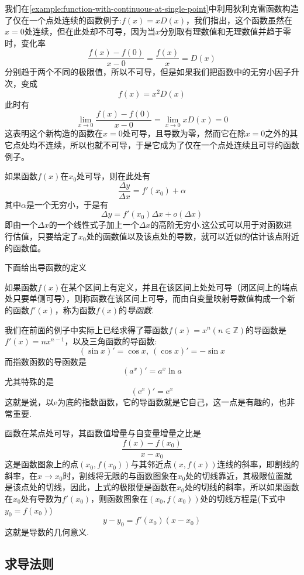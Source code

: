 \begin{example}
  我们在\autoref{example:function-with-continuous-at-single-point}中利用狄利克雷函数构造了仅在一个点处连续的函数例子:$f(x)=xD(x)$，我们指出，这个函数虽然在$x=0$处连续，但在此处却不可导，因为当$x$分别取有理数值和无理数值并趋于零时，变化率
  \[ \frac{f(x)-f(0)}{x-0} = \frac{f(x)}{x} = D(x) \]
  分别趋于两个不同的极限值，所以不可导，但是如果我们把函数中的无穷小因子升次，变成
  \[ f(x)=x^2D(x) \]
  此时有
  \[ \lim_{x \to 0} \frac{f(x)-f(0)}{x-0} = \lim_{x \to 0} xD(x) = 0 \]
  这表明这个新构造的函数在$x=0$处可导，且导数为零，然而它在除$x=0$之外的其它点处均不连续，所以也就不可导，于是它成为了仅在一个点处连续且可导的函数例子。
\end{example}

如果函数$f(x)$在$x_0$处可导，则在此处有
\[ \frac{\Delta y}{\Delta x} = f'(x_0)+\alpha \]
其中$\alpha$是一个无穷小，于是有
\[ \Delta y = f'(x_0)\Delta x + o(\Delta x) \]
即由一个$\Delta x$的一个线性式子加上一个$\Delta x$的高阶无穷小.这公式可以用于对函数进行估值，只要给定了$x_0$处的函数值以及该点处的导数，就可以近似的估计该点附近的函数值。

下面给出导函数的定义
\begin{definition}
  如果函数$f(x)$在某个区间上有定义，并且在该区间上处处可导（闭区间上的端点处只要单侧可导），则称函数在该区间上可导，而由自变量映射导数值构成一个新的函数$f'(x)$，称为函数$f(x)$的\emph{导函数}.
\end{definition}

\begin{example}
  我们在前面的例子中实际上已经求得了幂函数$f(x)=x^n(n \in \mathbb{Z})$的导函数是$f'(x)=nx^{n-1}$，以及三角函数的导函数:
  \[ (\sin{x})'=\cos{x}, \  (\cos{x})'=-\sin{x} \]
  而指数函数的导函数是
  \[ (a^x)'=a^x \ln{a} \]
  尤其特殊的是
  \[ (\mathrm{e}^x)' = \mathrm{e}^x \]
  这就是说，以$\mathrm{e}$为底的指数函数，它的导函数就是它自己，这一点是有趣的，也非常重要.
\end{example}

函数在某点处可导，其函数值增量与自变量增量之比是
\[ \frac{f(x)-f(x_0)}{x-x_0} \]
这是函数图象上的点$(x_0,f(x_0))$与其邻近点$(x,f(x))$连线的斜率，即割线的斜率，在$x \to x_0$时，割线将无限的与函数图象在$x_0$处的切线靠近，其极限位置就是该点处的切线，因此，上式的极限便是函数在$x_0$处的切线的斜率，所以如果函数在$x_0$处有导数为$f'(x_0)$，则函数图象在$(x_0,f(x_0))$处的切线方程是(下式中$y_0=f(x_0)$)
\[ y-y_0 = f'(x_0)(x-x_0) \]
这就是导数的几何意义.

\subsection{求导法则}
\label{sec:rule-of-derivative}

